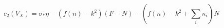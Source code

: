 \begin{equation}
\label{c_2V_X}
c_{2}(V_{X}) = \sigma_{*} \eta - \left( f(n) - k^{2} \right) (F - N)
               - \left( f(n) - k^{2} + \textstyle{\sum_{i}} \kappa_{i}
                 \right) N
\end{equation} 
